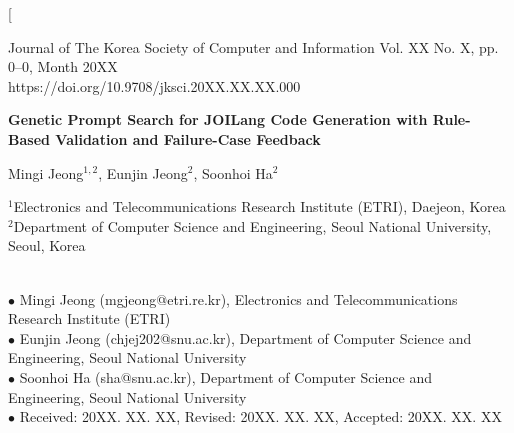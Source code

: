 \documentclass[10pt,twocolumn]{article}
\begin{document}
\twocolumn[
\begin{@twocolumnfalse}

\begin{center}
{\small Journal of The Korea Society of Computer and Information \hfill Vol. XX No. X, pp. 0--0, Month 20XX}\\
{\small https://doi.org/10.9708/jksci.20XX.XX.XX.000}
\end{center}

\vspace{0.6em}

\begin{center}
{\LARGE \bf Genetic Prompt Search for JOILang Code Generation with Rule-Based Validation and Failure-Case Feedback}
\end{center}

\vspace{0.4em}

\begin{center}
{\large Mingi Jeong$^{1,2}$, Eunjin Jeong$^{2}$, Soonhoi Ha$^{2}$}
\end{center}

\vspace{0.2em}

\begin{center}
{\small $^{1}$Electronics and Telecommunications Research Institute (ETRI), Daejeon, Korea}\\
{\small $^{2}$Department of Computer Science and Engineering, Seoul National University, Seoul, Korea}
\end{center}

\vspace{0.4em}

\\
{\small $\bullet$ Mingi Jeong (mgjeong@etri.re.kr), Electronics and Telecommunications Research Institute (ETRI)}\\
{\small $\bullet$ Eunjin Jeong (chjej202@snu.ac.kr), Department of Computer Science and Engineering, Seoul National University}\\
{\small $\bullet$ Soonhoi Ha (sha@snu.ac.kr), Department of Computer Science and Engineering, Seoul National University}\\
{\small $\bullet$ Received: 20XX. XX. XX, Revised: 20XX. XX. XX, Accepted: 20XX. XX. XX}

\vspace{0.7em}



\end{@twocolumnfalse}
\end{document}
